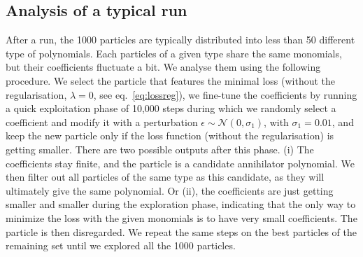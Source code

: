 \documentclass[11pt,a4paper]{article}
\begin{document}
	\subsection{Analysis of a typical run} \label{sec:singlerun}
	After a run, the 1000 particles are typically distributed into less than 50 different type of polynomials. Each particles of a given type share the same monomials, but their coefficients fluctuate a bit. We analyse them using the following procedure. We select the particle that features the minimal loss (without the regularisation, $\lambda=0$, see eq.~\eqref{eq:lossreg}), we fine-tune the coefficients by running a quick exploitation phase of 10,000 steps during which we randomly select a coefficient and modify it with a perturbation $\epsilon \sim \mathcal{N}(0, \sigma_1)$, with $\sigma_1=0.01$, and keep the new particle only if the loss function (without the regularisation) is getting smaller. There are two possible outputs after this phase. (i) The coefficients stay finite, and the particle is a candidate annihilator polynomial. We then filter out all  particles of the same type as this candidate, as they will ultimately give the same polynomial. Or (ii), the coefficients are just getting smaller and smaller during the exploration phase, indicating that the only way to minimize the loss with the given monomials is to have very small coefficients. The particle is then disregarded. We repeat the same steps on the best particles of the remaining set until we explored all the 1000 particles.
\end{document}
